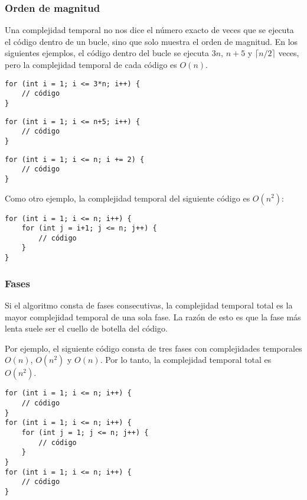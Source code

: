\subsubsection*{Orden de magnitud}

Una complejidad temporal no nos dice el número exacto
de veces que se ejecuta el código dentro de un bucle,
sino que solo muestra el orden de magnitud.
En los siguientes ejemplos, el código dentro del bucle
se ejecuta $3n$, $n+5$ y $\lceil n/2 \rceil$ veces,
pero la complejidad temporal de cada código es $O(n)$.

\begin{lstlisting}
for (int i = 1; i <= 3*n; i++) {
    // código
}
\end{lstlisting}

\begin{lstlisting}
for (int i = 1; i <= n+5; i++) {
    // código
}
\end{lstlisting}

\begin{lstlisting}
for (int i = 1; i <= n; i += 2) {
    // código
}
\end{lstlisting}

Como otro ejemplo,
la complejidad temporal del siguiente código es $O(n^2)$:

\begin{lstlisting}
for (int i = 1; i <= n; i++) {
    for (int j = i+1; j <= n; j++) {
        // código
    }
}
\end{lstlisting}

\subsubsection*{Fases}

Si el algoritmo consta de fases consecutivas,
la complejidad temporal total es la mayor
complejidad temporal de una sola fase.
La razón de esto es que la fase más lenta
suele ser el cuello de botella del código.

Por ejemplo, el siguiente código consta
de tres fases con complejidades temporales
$O(n)$, $O(n^2)$ y $O(n)$.
Por lo tanto, la complejidad temporal total es $O(n^2)$.

\begin{lstlisting}
for (int i = 1; i <= n; i++) {
    // código
}
for (int i = 1; i <= n; i++) {
    for (int j = 1; j <= n; j++) {
        // código
    }
}
for (int i = 1; i <= n; i++) {
    // código
}
\end{lstlisting}


